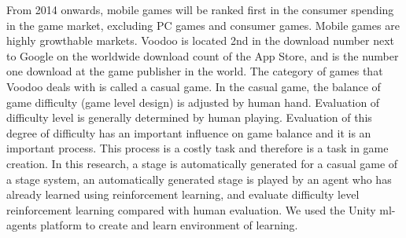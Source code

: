 From 2014 onwards, mobile games will be ranked first in the consumer spending in the game market, excluding PC games and consumer games.
Mobile games are highly growthable markets.
Voodoo is located 2nd in the download number next to Google on the worldwide download count of the App Store, and is the number one download at the game publisher in the world.
The category of games that Voodoo  deals with is called a casual game.
In the casual game, the balance of game difficulty (game level design) is adjusted by human hand.
Evaluation of difficulty level is generally determined by human playing.
Evaluation of this degree of difficulty has an important influence on game balance and it is an important process.
This process is a costly task and therefore is a task in game creation.
In this research, a stage is automatically generated for a casual game of a stage system, an automatically generated stage is played by an agent who has already learned using reinforcement learning,
and evaluate difficulty level reinforcement learning compared with human evaluation.
We used the Unity ml-agents platform to create and learn environment of learning.
